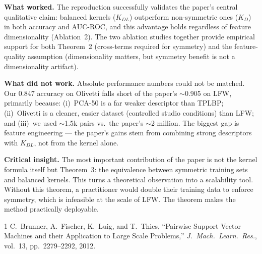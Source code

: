\documentclass[conference]{IEEEtran}
\begin{document}
\textbf{What worked.}
The reproduction successfully validates the paper's central qualitative
claim: balanced kernels ($K_{DL}$) outperform non-symmetric ones ($K_D$)
in both accuracy and AUC-ROC, and this advantage holds regardless of
feature dimensionality (Ablation~2). The two ablation studies together
provide empirical support for both Theorem~2 (cross-terms required for
symmetry) and the feature-quality assumption (dimensionality matters, but
symmetry benefit is not a dimensionality artifact).

\textbf{What did not work.}
Absolute performance numbers could not be matched. Our 0.847 accuracy on
Olivetti falls short of the paper's $\sim$0.905 on LFW, primarily because:
(i)~PCA-50 is a far weaker descriptor than TPLBP; (ii)~Olivetti is a
cleaner, easier dataset (controlled studio conditions) than LFW; and
(iii)~we used $\sim$1.5k pairs vs.\ the paper's $\sim$2 million. The
biggest gap is feature engineering --- the paper's gains stem from
combining strong descriptors with $K_{DL}$, not from the kernel alone.

\textbf{Critical insight.}
The most important contribution of the paper is not the kernel formula
itself but Theorem~3: the equivalence between symmetric training sets and
balanced kernels. This turns a theoretical observation into a scalability
tool. Without this theorem, a practitioner would double their training
data to enforce symmetry, which is infeasible at the scale of LFW. The
theorem makes the method practically deployable.

\begin{thebibliography}{1}
C.~Brunner, A.~Fischer, K.~Luig, and T.~Thies,
``Pairwise Support Vector Machines and their Application to Large Scale
Problems,''
\emph{J.\ Mach.\ Learn.\ Res.}, vol.~13, pp.~2279--2292, 2012.
\end{thebibliography}
\end{document}
